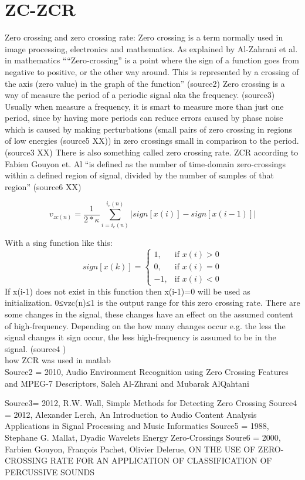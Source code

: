 \section{ZC-ZCR}


Zero crossing and zero crossing rate:
Zero crossing is a term normally used in image processing, electronics and mathematics. As explained by Al-Zahrani et al. in mathematics ““Zero-crossing” is a point where the sign of a function goes from negative to positive, or the other way around. This is represented by a crossing of the axis (zero value) in the graph of the function” (source2) 
Zero crossing is a way of measure the period of a periodic signal aka the frequency. (source3) Usually when measure a frequency, it is smart to measure more than just one period, since by having more periods can reduce errors caused by phase noise which is caused by making perturbations (small pairs of zero crossing in regions of low energies (source5 XX)) in zero crossings small in comparison to the period. (source3 XX)
There is also something called zero crossing rate. ZCR according to Fabien Gouyon et. Al “is defined as the number of time-domain zero-crossings within a defined region of signal, divided by the number of samples of that region” (source6 XX)




\begin{equation}\label{eq:ZCR}
v_{zc(n)}= \frac{1}{2* \kappa}\sum_{i=i_e(n)}^{i_e (n)}|sign[x(i)]-sign[x(i-1)]|
\end{equation}

With a sing function like this:
\begin{equation}
sign[x(k)]=
\begin{cases}
 1, & \text{if } x(i)>0\\ 
 0, & \text{if } x(i)=0\\
-1, & \text{if } x(i)<0
\end{cases}
\end{equation}
If x(i-1) does not exist in this function then x(i-1)=0 will be used as initialization. 
0≤vzc(n)≤1 is the output range for this zero crossing rate. There are some changes in the signal, these changes have an effect on the assumed content of high-frequency. Depending on the how many changes occur e.g. the less the signal changes it sign occur, the less high-frequency is assumed to be in the signal. (source4 ) 
\\
how ZCR was used in matlab
\\
Source2 = 2010, Audio Environment Recognition using Zero Crossing Features and MPEG-7 Descriptors, Saleh Al-Zhrani and Mubarak AlQahtani

Source3= 2012, R.W. Wall, Simple Methods for Detecting Zero Crossing 
Source4 = 2012, Alexander Lerch, An Introduction to Audio Content Analysis Applications in Signal Processing and Music Informatics
Source5 = 1988, Stephane G. Mallat, Dyadic Wavelets Energy Zero-Crossings
Soure6 = 2000, Farbien Gouyon, François Pachet, Olivier Delerue, ON THE USE OF ZERO-CROSSING RATE FOR AN APPLICATION OF CLASSIFICATION OF PERCUSSIVE SOUNDS  



